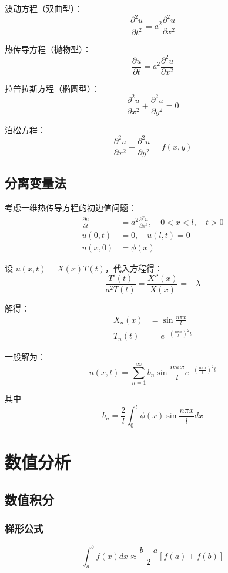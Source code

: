 \documentclass[12pt]{article}
\begin{document}
波动方程（双曲型）：
$$\frac{\partial^2 u}{\partial t^2} = a^2 \frac{\partial^2 u}{\partial x^2}$$

热传导方程（抛物型）：
$$\frac{\partial u}{\partial t} = a^2 \frac{\partial^2 u}{\partial x^2}$$

拉普拉斯方程（椭圆型）：
$$\frac{\partial^2 u}{\partial x^2} + \frac{\partial^2 u}{\partial y^2} = 0$$

泊松方程：
$$\frac{\partial^2 u}{\partial x^2} + \frac{\partial^2 u}{\partial y^2} = f(x, y)$$

\subsection{分离变量法}

考虑一维热传导方程的初边值问题：
\begin{align}
\frac{\partial u}{\partial t} &= a^2 \frac{\partial^2 u}{\partial x^2}, \quad 0 < x < l, \quad t > 0 \\
u(0, t) &= 0, \quad u(l, t) = 0 \\
u(x, 0) &= \phi(x)
\end{align}

设 $u(x, t) = X(x)T(t)$，代入方程得：
$$\frac{T'(t)}{a^2 T(t)} = \frac{X''(x)}{X(x)} = -\lambda$$

解得：
\begin{align}
X_n(x) &= \sin\frac{n\pi x}{l} \\
T_n(t) &= e^{-\left(\frac{n\pi a}{l}\right)^2 t}
\end{align}

一般解为：
$$u(x, t) = \sum_{n=1}^{\infty} b_n \sin\frac{n\pi x}{l} e^{-\left(\frac{n\pi a}{l}\right)^2 t}$$

其中
$$b_n = \frac{2}{l} \int_0^l \phi(x) \sin\frac{n\pi x}{l} dx$$


\section{数值分析}

\subsection{数值积分}

\subsubsection{梯形公式}
$$\int_a^b f(x) dx \approx \frac{b-a}{2}[f(a) + f(b)]$$
\end{document}
